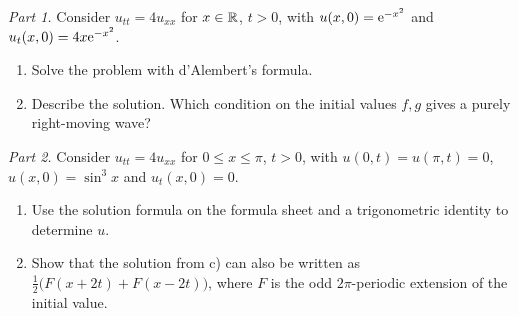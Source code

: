 \emph{Part 1.} Consider $u_{tt}=4u_{xx}$ for $x\in\mathbb{R}$, $t>0$, with $u(x,0)=\mathrm{e}^{-x^2}$ and $u_t(x,0)=4x\mathrm{e}^{-x^2}$.
\begin{enumerate}
\item Solve the problem with d'Alembert's formula.
\item Describe the solution. Which condition on the initial values $f,g$ gives a purely right-moving wave?
\end{enumerate}
\emph{Part 2.} Consider $u_{tt}=4u_{xx}$ for $0\le x\le\pi$, $t>0$, with $u(0,t)=u(\pi,t)=0$, $u(x,0)=\sin^3x$ and $u_t(x,0)=0$.
\begin{enumerate}[resume]
\item Use the solution formula on the formula sheet and a trigonometric identity to determine $u$.
\item Show that the solution from c) can also be written as $\frac12\big(F(x+2t)+F(x-2t)\big)$, where $F$ is the odd $2\pi$-periodic extension of the initial value.
\end{enumerate}

